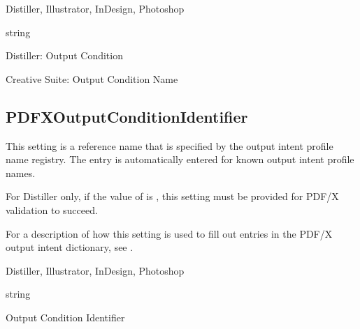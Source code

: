 \documentclass[letterpaper,12pt,english,openany,oneside]{sphinxmanual}
\begin{document}
Distiller, Illustrator, InDesign, Photoshop

\label{\detokenize{PDF_Create_CommonSettings:type-113}}

string

\label{\detokenize{PDF_Create_CommonSettings:ui-name-95}}

Distiller: Output Condition

Creative Suite: Output Condition Name

\label{\detokenize{PDF_Create_CommonSettings:default-value-108}}

\begin{sphinxVerbatim}[commandchars=\\\{\}]
\end{sphinxVerbatim}




\subsection{PDFXOutputConditionIdentifier}
\label{\detokenize{PDF_Create_CommonSettings:pdfxoutputconditionidentifier}}
This setting is a reference name that is specified by the output intent profile name registry. The entry is automatically entered for known output intent profile names.

For Distiller only, if the value of  is  , this setting must be provided for PDF/X validation to succeed.

For a description of how this setting is used to fill out entries in the PDF/X output intent dictionary, see .

\label{\detokenize{PDF_Create_CommonSettings:supported-by-115}}

Distiller, Illustrator, InDesign, Photoshop

\label{\detokenize{PDF_Create_CommonSettings:type-114}}

string

\label{\detokenize{PDF_Create_CommonSettings:ui-name-96}}

Output Condition Identifier
\end{document}
